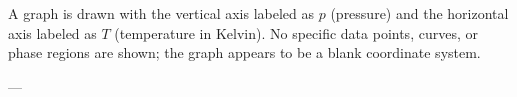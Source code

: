 A graph is drawn with the vertical axis labeled as \( p \) (pressure) and the horizontal axis labeled as \( T \) (temperature in Kelvin). No specific data points, curves, or phase regions are shown; the graph appears to be a blank coordinate system.

---